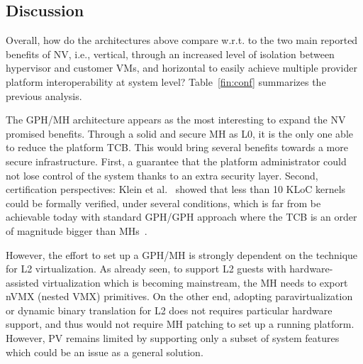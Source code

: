 \documentclass{sig-alternate}
\begin{document}
\subsection{Discussion}

\noindent Overall, how do the architectures above compare w.r.t. to the two main reported benefits of NV, i.e., vertical, through an increased level of isolation between hypervisor and customer VMs, and horizontal to easily achieve multiple provider platform interoperability at system level? Table~\ref{fin:conf} summarizes the previous analysis. 

The GPH/MH architecture appears as the most interesting to expand the NV promised benefits. Through a solid and secure MH as L0, it is the only one able to reduce the platform TCB. This would bring several benefits towards a more secure infrastructure. First, a guarantee that the platform administrator could not lose control of the system thanks to an extra security layer. Second, certification perspectives: Klein et al.~\cite{Klein:2009} showed that less than 10 KLoC kernels could be formally verified, under several conditions, which is far from be achievable today with standard GPH/GPH approach where the TCB is an order of 
magnitude bigger than MHs~\cite{nova}.

However, the effort to set up a GPH/MH is strongly dependent on the technique for L2 virtualization. As already seen, to support L2 guests with hardware-assisted virtualization which is becoming mainstream, the MH needs to export nVMX (nested VMX) primitives. On the other end, adopting paravirtualization or dynamic binary translation for L2 does not requires particular hardware support, and thus would not require MH patching to set up a running platform. However, PV remains limited by supporting only a subset of system features which could be an issue as a general solution.
\end{document}
